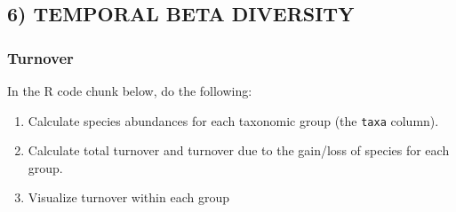 \documentclass[]{article}
\providecommand{\tightlist}{%
  \setlength{\itemsep}{0pt}\setlength{\parskip}{0pt}}
\begin{document}
\subsection{6) TEMPORAL BETA DIVERSITY}\label{temporal-beta-diversity}

\subsubsection{Turnover}\label{turnover}

In the R code chunk below, do the following:

\begin{enumerate}
\def\labelenumi{\arabic{enumi}.}
\tightlist
\item
  Calculate species abundances for each taxonomic group (the
  \texttt{taxa} column).
\item
  Calculate total turnover and turnover due to the gain/loss of species
  for each group.
\item
  Visualize turnover within each group
\end{enumerate}
\end{document}
